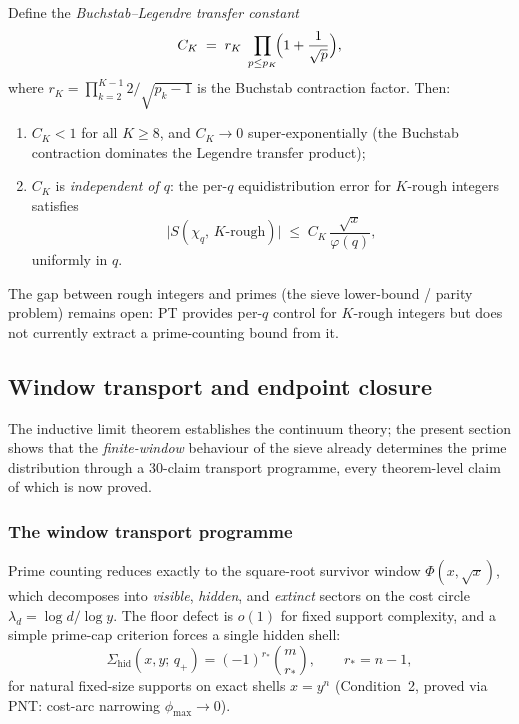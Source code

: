 \documentclass[12pt,a4paper]{article}
\begin{document}
\begin{proposition}
\label{prop:CK_uniform}
Define the \emph{Buchstab--Legendre transfer constant}
\begin{equation}
  C_K \;=\; r_K \;\prod_{p \leq p_K}\!\Bigl(1 + \frac{1}{\sqrt{p}}\Bigr),
  \label{eq:CK_def}
\end{equation}
where $r_K = \prod_{k=2}^{K-1} 2/\!\sqrt{p_k-1}$ is the Buchstab
contraction factor.  Then:
\begin{enumerate}[nosep]
\item $C_K < 1$ for all $K \geq 8$, and $C_K \to 0$
  super-exponentially (the Buchstab contraction dominates the
  Legendre transfer product);
\item $C_K$ is \emph{independent of $q$}: the per-$q$ equidistribution
  error for $K$-rough integers satisfies
  \[
    \bigl|S(\chi_q,\,K\text{-rough})\bigr|
    \;\leq\; C_K\,\frac{\sqrt{x}}{\varphi(q)},
  \]
  uniformly in $q$.
\end{enumerate}
The gap between rough integers and primes
(the sieve lower-bound / parity problem) remains open: PT provides
per-$q$ control for $K$-rough integers but does not currently extract
a prime-counting bound from it.
\end{proposition}

\subsection{Window transport and endpoint closure}
\label{sec:ch9_window_transport}

The inductive limit theorem establishes the continuum theory; the
present section shows that the \emph{finite-window} behaviour of the
sieve already determines the prime distribution through a
30-claim transport programme, every theorem-level claim of which
is now proved.

\subsubsection{The window transport programme}

Prime counting reduces exactly to the square-root survivor window
$\Phi(x,\sqrt{x})$, which decomposes into \emph{visible},
\emph{hidden}, and \emph{extinct} sectors on the cost circle
$\lambda_d = \log d/\log y$.  The floor
defect is $o(1)$ for fixed support complexity, and a simple prime-cap
criterion forces a single hidden shell:
\begin{equation}
  \Sigma_{\text{hid}}(x,y;\,q_+)
  = (-1)^{r_*}\binom{m}{r_*},
  \qquad r_* = n - 1,
  \label{eq:one_shell}
\end{equation}
for natural fixed-size supports on exact shells $x = y^n$
(Condition~2, proved via PNT: cost-arc narrowing $\phi_{\max}\to 0$).
\end{document}
